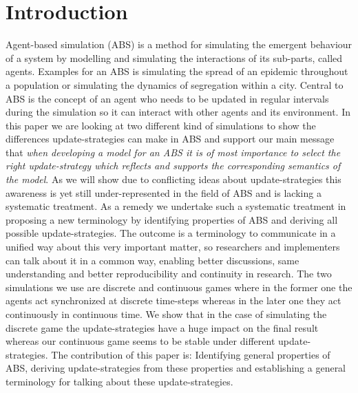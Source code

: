 \section{Introduction}
Agent-based simulation (ABS) is  a method for simulating the emergent behaviour of a system by modelling and simulating the interactions of its sub-parts, called agents. Examples for an ABS is simulating the spread of an epidemic throughout a population or simulating the dynamics of segregation within a city. Central to ABS is the concept of an agent who needs to be updated in regular intervals during the simulation so it can interact with other agents and its environment. In this paper we are looking at two different kind of simulations to show the differences update-strategies can make in ABS and support our main message that \textit{when developing a model for an ABS it is of most importance to select the right update-strategy which reflects and supports the corresponding semantics of the model}. As we will show due to conflicting ideas about update-strategies this awareness is yet still under-represented in the field of ABS and is lacking a systematic treatment. As a remedy we undertake such a systematic treatment in proposing a new terminology by identifying properties of ABS and deriving all possible update-strategies. The outcome is a terminology to communicate in a unified way about this very important matter, so researchers and implementers can talk about it in a common way, enabling better discussions, same understanding and better reproducibility and continuity in research.
The two simulations we use are discrete and continuous games where in the former one the agents act synchronized at discrete time-steps whereas in the later one they act continuously in continuous time. We show that in the case of simulating the discrete game the update-strategies have a huge impact on the final result whereas our continuous game seems to be stable under different update-strategies. The contribution of this paper is: Identifying general properties of ABS, deriving update-strategies from these properties and establishing a general terminology for talking about these update-strategies.